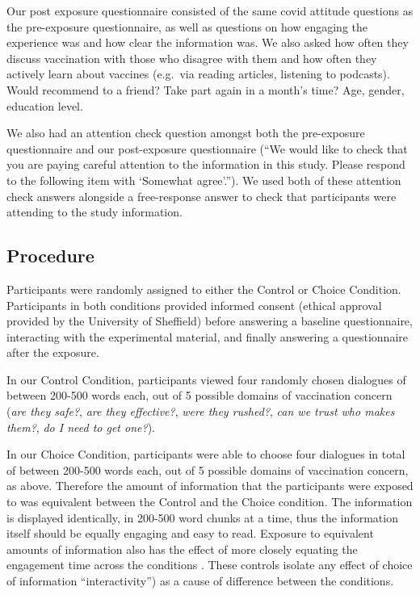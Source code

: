 \documentclass[english,,jou,floatsintext]{apa6}
\begin{document}
Our post exposure questionnaire consisted of the same covid attitude questions as the pre-exposure questionnaire, as well as questions on how engaging the experience was and how clear the information was. We also asked how often they discuss vaccination with those who disagree with them and how often they actively learn about vaccines (e.g.~via reading articles, listening to podcasts). Would recommend to a friend? Take part again in a month's time? Age, gender, education level.

We also had an attention check question amongst both the pre-exposure questionnaire and our post-exposure questionnaire (\enquote{We would like to check that you are paying careful attention to the information in this study. Please respond to the following item with \enquote{Somewhat agree}.}). We used both of these attention check answers alongside a free-response answer to check that participants were attending to the study information.

\hypertarget{procedure}{%
\subsection{Procedure}\label{procedure}}

Participants were randomly assigned to either the Control or Choice Condition. Participants in both conditions provided informed consent (ethical approval provided by the University of Sheffield) before answering a baseline questionnaire, interacting with the experimental material, and finally answering a questionnaire after the exposure.

In our Control Condition, participants viewed four randomly chosen dialogues of between 200-500 words each, out of 5 possible domains of vaccination concern (\emph{are they safe?}, \emph{are they effective?}, \emph{were they rushed?}, \emph{can we trust who makes them?}, \emph{do I need to get one?}).

In our Choice Condition, participants were able to choose four dialogues in total of between 200-500 words each, out of 5 possible domains of vaccination concern, as above. Therefore the amount of information that the participants were exposed to was equivalent between the Control and the Choice condition. The information is displayed identically, in 200-500 word chunks at a time, thus the information itself should be equally engaging and easy to read. Exposure to equivalent amounts of information also has the effect of more closely equating the engagement time across the conditions . These controls isolate any effect of choice of information \enquote{interactivity}) as a cause of difference between the conditions.
\end{document}
